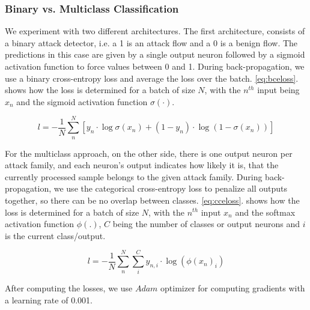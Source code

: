 \documentclass[conference]{IEEEtran}
\begin{document}
\subsubsection{Binary vs. Multiclass Classification}
We experiment with two different architectures. The first architecture, consists of a binary attack detector, i.e. a 1 is an attack flow and a 0 is a benign flow. The predictions in this case are given by a single output neuron followed by a sigmoid activation function to force values between 0 and 1. During back-propagation, we use a binary cross-entropy loss and average the loss over the batch. \autoref{eq:bceloss}. shows how the loss is determined for a batch of size $N$, with the $n^{th}$ input being $x_{n}$ and the sigmoid activation function $\sigma(\cdot)$.

\begin{equation}
\label{eq:bceloss}
l = - \frac{1}{N} \sum_{n}^{N} [y_n \cdot \log \sigma (x_{n}) + (1 - y_n) \cdot \log (1 - \sigma (x_{n}))]
\end{equation}

For the multiclass approach, on the other side, there is one output neuron per attack family, and each neuron's output indicates how likely it is, that the currently processed sample belongs to the given attack family. During back-propagation, we use the categorical cross-entropy loss to penalize all outputs together, so there can be no overlap between classes. \autoref{eq:cceloss}. shows how the loss is determined for a batch of size $N$, with the $n^{th}$ input $x_{n}$ and the softmax activation function \cite{noauthor_softmax_2020} $\phi(.)$, $C$ being the number of classes or output neurons and $i$ is the current class/output.

\begin{equation}
\label{eq:cceloss}
l = - \frac{1}{N} \sum_{n}^{N} \sum_{i}^{C} y_{n,i} \cdot \log (\phi(x_{n})_{i})
\end{equation}

After computing the losses, we use $Adam$ optimizer \cite{kingma_adam_2017} for computing gradients with a learning rate of 0.001.
\end{document}

